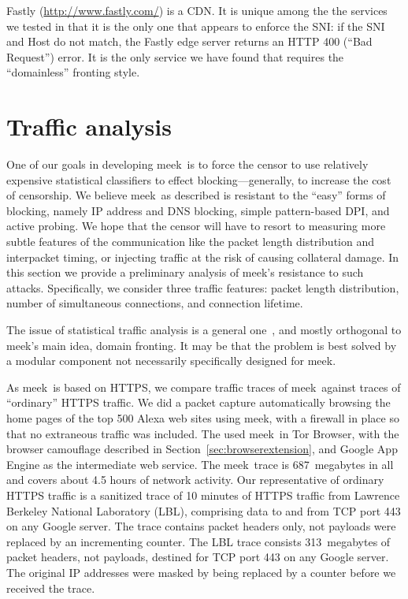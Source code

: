 \documentclass[conference]{IEEEtran}
\def\meek{meek}
\begin{document}
Fastly (\url{http://www.fastly.com/}) is a CDN.
It is unique among the the services we tested in that
it is the only one that appears to enforce the SNI:
if the SNI and Host do not match,
the Fastly edge server returns an HTTP 400 (``Bad Request'') error.
It is the only service we have found
that requires the ``domainless'' fronting style.

\section{Traffic analysis}
\label{sec:trafficanalysis}

One of our goals in developing \meek\ is to force
the censor to use relatively expensive statistical classifiers
to effect blocking---generally, to increase the cost of censorship.
We believe \meek\ as described is resistant to the ``easy''
forms of blocking, namely IP address and DNS blocking,
simple pattern-based DPI,
and active probing.
We hope that the censor will have to resort to measuring
more subtle features of the communication like
the packet length distribution and interpacket timing,
or injecting traffic at the risk of causing collateral damage.
In this section we provide a preliminary analysis
of \meek's resistance to such attacks.
Specifically, we consider three traffic features:
packet length distribution,
number of simultaneous connections,
and connection lifetime.

The issue of statistical traffic analysis is a general one~\cite{trafficmorphing},
and mostly orthogonal to \meek's main idea, domain fronting.
It may be that the problem is
best solved by a modular component not
necessarily specifically designed for \meek.

As \meek\ is based on HTTPS,
we compare traffic traces of \meek\ against
traces of ``ordinary'' HTTPS traffic.
We did a packet capture
automatically browsing the home pages
of the top 500 Alexa web sites using \meek,
with a firewall in place so that no extraneous traffic was included.
The used \meek\ in Tor Browser,
with the browser camouflage described in Section~\ref{sec:browserextension},
and Google App Engine as the intermediate web service.
The \meek\ trace is 687~megabytes in all
and covers about 4.5 hours of network activity.
Our representative of ordinary HTTPS traffic
is a sanitized trace of 10 minutes of HTTPS traffic
from Lawrence Berkeley National Laboratory (LBL),
comprising data to and from TCP port 443 on any Google server.
The trace contains packet headers only, not payloads
were replaced by an incrementing counter.
The LBL trace consists 313~megabytes of packet headers,
not payloads, destined for TCP port 443 on any Google server.
The original IP addresses were masked by being
replaced by a counter before we received the trace.
\end{document}
